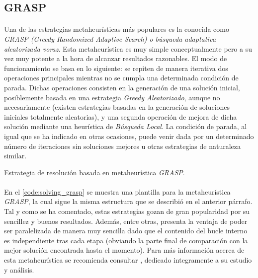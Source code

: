 \documentclass{subfiles}
\begin{document}
      \subsection{GRASP}
      \label{sec:solving_grasp}

        \paragraph{}
        Una de las estrategias metaheurísticas más populares es la conocida como \emph{GRASP (Greedy Randomized Adaptive Search) o búsqueda adaptativa aleatorizada voraz}. Esta metaheurística es muy simple conceptualmente pero a su vez muy potente a la hora de alcanzar resultados razonables. El modo de funcionamiento se basa en lo siguiente: se repiten de manera iterativa dos operaciones principales mientras no se cumpla una determinada condición de parada. Dichas operaciones consisten en la generación de una solución inicial, posiblemente basada en una estrategia \emph{Greedy Aleatorizado}, aunque no necesariamente (existen estrategias basadas en la generación de soluciones iniciales totalmente aleatorias), y una segunda operación de mejora de dicha solución mediante una heurística de \emph{Búsqueda Local}. La condición de parada, al igual que se ha indicado en otras ocasiones, puede venir dada por un determinado número de iteraciones sin soluciones mejores u otras estrategias de naturaleza similar.

      \begin{algorithm}[ht]
        \SetAlgoLined
        \caption{Estrategia de resolución basada en metaheurística \emph{GRASP}.}
        \label{code:solving_grasp}
      \end{algorithm}

      \paragraph{}
      En el \cref{code:solving_grasp} se muestra una plantilla para la metaheurística \emph{GRASP}, la cual sigue la misma estructura que se describió en el anterior párrafo. Tal y como se ha comentado, estas estrategias gozan de gran popularidad por su sencillez y buenos resultados. Además, entre otras, presenta la ventaja de poder ser paralelizada de manera muy sencilla dado que el contenido del bucle interno es independiente tras cada etapa (obviando la parte final de comparación con la mejor solución encontrada hasta el momento). Para más información acerca de esta metaheurística se recomienda consultar \cite{resende2016optimization}, dedicado integramente a su estudio y análisis.
\end{document}
